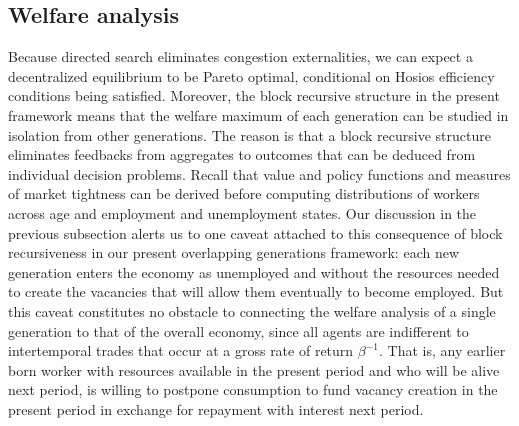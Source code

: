 \subsection{Welfare analysis}
Because directed search eliminates congestion externalities,
we can expect a
decentralized equilibrium to  be Pareto optimal, conditional
on  Hosios efficiency conditions being satisfied. Moreover,
 the  block recursive structure in the present
framework means that the welfare maximum of each generation can be
studied in isolation from other generations. The
reason is that a block recursive structure
eliminates  feedbacks from aggregates to outcomes that can be
deduced from individual decision problems.
Recall that value and policy functions and measures of market
tightness can be derived
before computing distributions of workers across age and employment and
unemployment states.
Our discussion in the previous subsection alerts us to
one caveat attached to this consequence of block recursiveness in our  present
overlapping generations
framework: each new generation enters the economy as
unemployed and  without the resources needed to create the vacancies
that will allow them eventually to become employed. But this caveat  constitutes no
obstacle to connecting the welfare analysis of
a single generation to that of  the overall economy, since
all agents are  indifferent to intertemporal trades that occur
at a gross rate of return $\beta^{-1}$. That is, any earlier born
worker with resources available in the present period and who will
be alive next period, is willing to postpone consumption to
fund vacancy creation in the present period in exchange
for repayment with interest next period.


